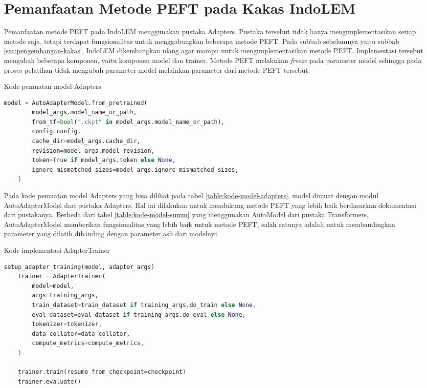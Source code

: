\section{Pemanfaatan Metode PEFT pada Kakas IndoLEM}

Pemanfaatan metode PEFT pada IndoLEM menggunakan pustaka Adapters. Pustaka tersebut tidak hanya mengimplementasikan setiap metode saja, tetapi terdapat fungsionalitas untuk menggabungkan beberapa metode PEFT. Pada subbab sebelumnya yaitu subbab \ref{sec:pengembangan-kakas}, IndoLEM dikembangkan ulang agar mampu untuk mengimplementasikan metode PEFT. Implementasi tersebut  mengubah beberapa komponen, yaitu komponen model dan trainer. Metode PEFT  melakukan \textit{freeze} pada parameter model sehingga pada proses pelatihan tidak  mengubah parameter model melainkan parameter dari metode PEFT tersebut.

\begin{table}[h]
    \caption{Kode pemuatan model Adapters}
    \label{table:kode-model-adapters}
    \begin{lstlisting}[language=python]
    model = AutoAdapterModel.from_pretrained(
        model_args.model_name_or_path,
        from_tf=bool(".ckpt" in model_args.model_name_or_path),
        config=config,
        cache_dir=model_args.cache_dir,
        revision=model_args.model_revision,
        token=True if model_args.token else None,
        ignore_mismatched_sizes=model_args.ignore_mismatched_sizes,
    )
    \end{lstlisting}
\end{table}

Pada kode pemuatan model Adapters yang bisa dilihat pada tabel \ref{table:kode-model-adapters}, model dimuat dengan modul AutoAdapterModel dari pustaka Adapters. Hal ini dilakukan untuk mendukung metode PEFT yang lebih baik berdasarkan dokumentasi dari pustakanya. Berbeda dari tabel \ref{table:kode-model-summ} yang menggunakan AutoModel dari pustaka Transformers, AutoAdapterModel memberikan fungsionalitas yang lebih baik untuk metode PEFT, salah satunya adalah untuk membandingkan parameter yang  dilatih dibanding dengan parameter asli dari modelnya.

\begin{table}[h]
    \caption{Kode implementasi AdapterTrainer}
    \label{table:kode-adaptertrainer}
    \begin{lstlisting}[language=python]
    setup_adapter_training(model, adapter_args)
    trainer = AdapterTrainer(
        model=model,
        args=training_args,
        train_dataset=train_dataset if training_args.do_train else None,
        eval_dataset=eval_dataset if training_args.do_eval else None,
        tokenizer=tokenizer,
        data_collator=data_collator,
        compute_metrics=compute_metrics,
    )

    trainer.train(resume_from_checkpoint=checkpoint)
    trainer.evaluate()
    \end{lstlisting}
\end{table}

